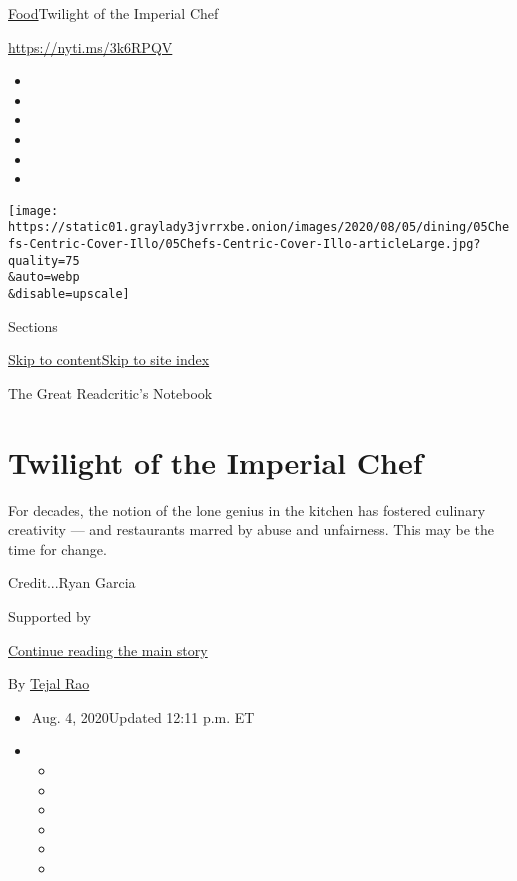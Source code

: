 \href{/section/food}{Food}\textbar{}Twilight of the Imperial Chef

\url{https://nyti.ms/3k6RPQV}

\begin{itemize}
\item
\item
\item
\item
\item
\item
\end{itemize}

\texttt{[image: https://static01.graylady3jvrrxbe.onion/images/2020/08/05/dining/05Chefs-Centric-Cover-Illo/05Chefs-Centric-Cover-Illo-articleLarge.jpg?quality=75\\\&auto=webp\\\&disable=upscale]}

Sections

\protect\hyperlink{site-content}{Skip to
content}\protect\hyperlink{site-index}{Skip to site index}

The Great Readcritic's Notebook

\hypertarget{twilight-of-the-imperial-chef}{%
\section{Twilight of the Imperial
Chef}\label{twilight-of-the-imperial-chef}}

For decades, the notion of the lone genius in the kitchen has fostered
culinary creativity --- and restaurants marred by abuse and unfairness.
This may be the time for change.

Credit...Ryan Garcia

Supported by

\protect\hyperlink{after-sponsor}{Continue reading the main story}

By \href{https://www.nytimes3xbfgragh.onion/by/tejal-rao}{Tejal Rao}

\begin{itemize}
\item
  Aug. 4, 2020Updated 12:11 p.m. ET
\item
  \begin{itemize}
  \item
  \item
  \item
  \item
  \item
  \item
  \end{itemize}
\end{itemize}

